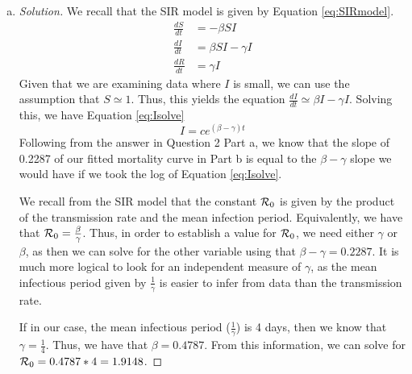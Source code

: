 \documentclass[12pt]{article}\usepackage[]{graphicx}\usepackage[]{color}
\begin{document}
\begin{enumerate}[(a)]
{\begin{proof}[Solution]
{To determine coefficients, we restricted the data to the portion in which the semi-log plot looks approximately linear, and fit a linear model using the \texttt{lm()} function to the log-transformed data. The slope and intercept of this fit is given below.

\begin{center}
\begin{tabular}{c c}\\
 slope & intercept 
\end{tabular}
\end{center}
  
  
  }
  \end{proof}
  }
  
\item \EstimateRnc

  {\color{blue} \begin{proof}[Solution]
  {\color{magenta}
  We recall that the SIR model is given by Equation \ref{eq:SIRmodel}.
\begin{equation}
\label{eq:SIRmodel}
\begin{aligned}
\frac{dS}{dt}&=-\beta SI \\
\frac{dI}{dt}&=\beta SI - \gamma I \\
\frac{dR}{dt}&=\gamma I 
\end{aligned}
\end{equation}
Given that we are examining data where $I$ is small, we can use the assumption that $S\simeq 1$. Thus, this yields the equation $\frac{dI}{dt}\simeq\beta I - \gamma I$. Solving this, we have Equation \ref{eq:Isolve}
\begin{equation}
\label{eq:Isolve}
I=ce^{(\beta - \gamma)t}
\end{equation}
Following from the answer in Question 2 Part a, we know that the slope of 0.2287 of our fitted mortality curve in Part b is equal to the $\beta - \gamma$ slope we would have if we took the log of Equation \ref{eq:Isolve}.

We recall from the SIR model that the constant ${\cal R}_0$ is given by the product of the transmission rate and the mean infection period. Equivalently, we have that ${\cal R}_0 = \frac{\beta}{\gamma}$. Thus, in order to establish a value for ${\cal R}_0$, we need either $\gamma$ or $\beta$, as then we can solve for the other variable using that $\beta - \gamma = 0.2287$. It is much more logical to look for an independent measure of $\gamma$, as the mean infectious period given by $\frac{1}{\gamma}$ is easier to infer from data than the transmission rate. 

If in our case, the mean infectious period ($\frac{1}{\gamma}$) is 4 days, then we know that $\gamma = \frac{1}{4}$. Thus, we have that $\beta=0.4787$. From this information, we can solve for ${\cal R}_0 = 0.4787*4 = 1.9148$.
  }
  \end{proof}
  }

\end{enumerate}
\end{document}
